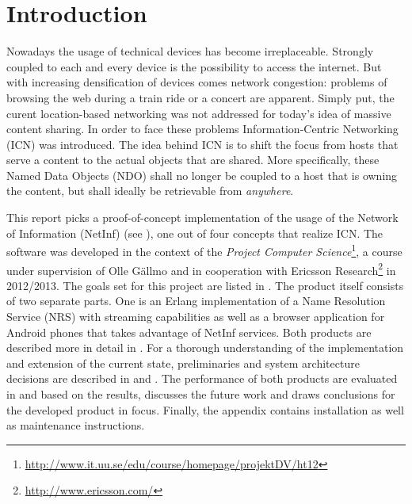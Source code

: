 \chapter{Introduction}

Nowadays the usage of technical devices has become irreplaceable. Strongly coupled to
each and every device is the possibility to access the internet. But with increasing
densification of devices comes network congestion: problems of
browsing the web during a train ride or a concert are apparent. Simply put, the curent
location-based networking was not addressed for today's idea of massive content sharing. 
In order to face these problems Information-Centric Networking (ICN) was introduced.
The idea behind ICN is to shift the focus from hosts that serve a content to the actual objects that
are shared. More specifically, these Named Data Objects (NDO) shall no longer be coupled
to a host that is owning the content, but shall ideally be retrievable from \textit{anywhere}.

This report picks a proof-of-concept implementation of the usage of the Network of Information (NetInf) 
(see ), one out of four concepts that realize ICN. The software was
developed in the context of the 
\textit{Project Computer Science}\footnote{\url{http://www.it.uu.se/edu/course/homepage/projektDV/ht12}},
a course under supervision of Olle G\"{a}llmo and in cooperation with Ericsson Research\footnote{\url{http://www.ericsson.com/}}
in 2012/2013. The goals set for this project are listed in . 
The product itself consists of two separate parts. One is an Erlang implementation of a Name Resolution Service (NRS) with streaming capabilities
as well as a browser application for Android phones that takes advantage of NetInf services. 
Both products are described more in detail in . For a thorough understanding
of the implementation and extension of the current state, preliminaries and system architecture decisions are 
described in  and . 
The performance of both products are evaluated in  and based on the results,
 discusses the future work and draws conclusions for the developed product
in focus. Finally, the appendix contains installation as well as maintenance instructions.